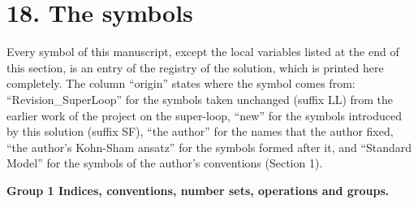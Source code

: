\documentclass[
  10pt,
]{article}
\begin{document}
\hypertarget{the-symbols}{%
\section{18. The symbols}\label{the-symbols}}

Every symbol of this manuscript, except the local variables listed at
the end of this section, is an entry of the registry of the solution,
which is printed here completely. The column ``origin'' states where the
symbol comes from: ``Revision\_SuperLoop'' for the symbols taken
unchanged (suffix LL) from the earlier work of the project on the
super-loop, ``new'' for the symbols introduced by this solution (suffix
SF), ``the author'' for the names that the author fixed, ``the author's
Kohn-Sham ansatz'' for the symbols formed after it, and ``Standard
Model'' for the symbols of the author's conventions (Section 1).

\textbf{Group 1 Indices, conventions, number sets, operations and
groups.}
\end{document}
